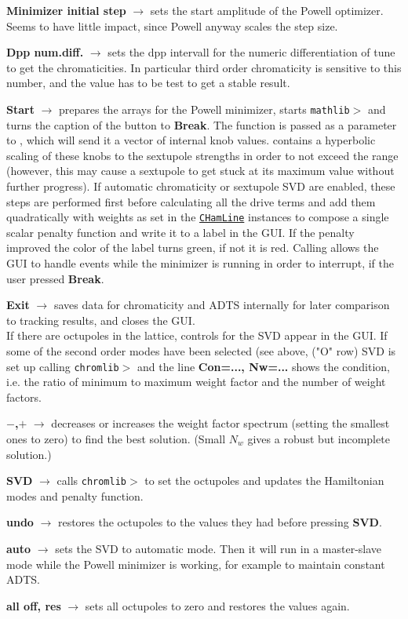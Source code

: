 \documentclass[12pt]{article}
\newcommand\code[1]{{\tt #1}}
\newcommand{\ofld}[1]{\colorbox{black!15}{{\bf #1}}}
\newcommand{\ofldx}[1]{\colorbox{black!15}{(#1)}}
\newcommand\guico[1]{{\color{blue}\code{#1}}}
\newcommand{\unico}[1]{{\color{burntorange}\code{#1}}}
\newcommand{\evcod}[2]{\ofld{#1} $\rightarrow$ \guico{#2}}
\newcommand{\prcod}[2]{\opauni{#1}$>$\unico{#2}}
\newcommand{\opaguif}[1]{\colorbox{violet!30}{\code{#1}}}
\newcommand{\oguif}[1]{\hyperref[#1]{\opaguif{#1}}}
\newcommand{\opauni}[1]{\colorbox{orange!30}{\code{#1}}}
\newcommand{\todo}[1]{{\color{red} #1}}
\begin{document}
{\evcod{Minimizer initial step}{EdMinAmp(KeyPress,Exit)} sets the start amplitude of the Powell optimizer. \todo{Seems to have little impact, since Powell anyway scales the step size.}

\evcod{Dpp num.diff.}{EdNumDiff(KeyPress,Exit)} sets the dpp intervall for the numeric differentiation of tune to get the chromaticities. In particular third order chromaticity is sensitive to this number, and the value has to be test to get a stable result.

\evcod{Start}{ButMinClick} prepares the arrays for the Powell minimizer, starts \prcod{mathlib}{Powell} and turns the caption of the button to \ofld{Break}. The function \guico{PenaltyFunction} is passed as a parameter to \unico{Powell}, which will send it a vector of internal knob values. \guico{PenaltyFunction} contains a hyperbolic scaling of these knobs to the sextupole strengths in order to not exceed the range (however, this may cause a sextupole to get stuck at its maximum value without further progress). If automatic chromaticity or sextupole SVD are enabled, these steps are performed first before calculating all the drive terms and add them quadratically with weights as set in the \oguif{CHamLine} instances to compose a single scalar penalty function and write it to a label in the GUI. If the penalty improved the color of the label turns green, if not it is red. Calling \unico{Application.ProcessMessages} allows the GUI to handle events while the minimizer is running in order to interrupt, if the user pressed \ofld{Break}. 

\evcod{Exit}{ButExClick} saves data for chromaticity and ADTS internally for later comparison to tracking results, and closes the GUI.\\

If there are octupoles in the lattice, controls for the SVD appear in the GUI. If some of the second order modes have been selected (see above, \ofldx{"O" row} SVD is set up calling \prcod{chromlib}{Oct\_SVDCMP} and the line \ofld{Con=..., Nw=...} shows the condition, i.e. the ratio of minimum to maximum weight factor and the number of weight factors.

\evcod{$-$,$+$}{ButOsvdN(m,p)Click} decreases or increases the weight factor spectrum (setting the smallest ones to zero) to find the best solution. (Small $N_w$ gives a robust but incomplete solution.)

\evcod{SVD}{ButOsvdDoClick} calls \prcod{chromlib}{Oct\_SVBKSB} to set the octupoles and updates the Hamiltonian modes and penalty function.

\evcod{undo}{ButOsvdUndoClick} restores the octupoles to the values they had before pressing \ofld{SVD}.

\evcod{auto}{chkOsvdAutoClick} sets the SVD to automatic mode. Then it will run in a master-slave mode while the Powell minimizer is working, for example to maintain constant ADTS.

\evcod{all off, res}{ButOct(Off, Res)Click} sets all octupoles to zero and restores the values again.
}
\end{document}
